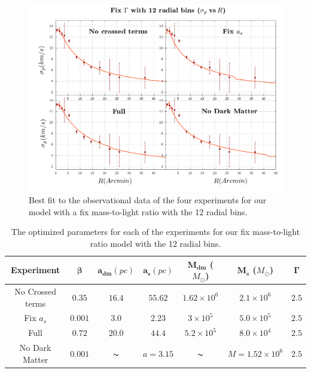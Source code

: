 \begin{figure}[H]
\centering
\includegraphics[width=15cm]{images/fix_gamma_refinado_12.png}
\caption[Best fit of our model with a fix mass-to-light ratio for the 12 radial bins]{Best fit to the observational data of the four experiments for our model with a fix mass-to-light ratio with the 12 radial bins.}
\end{figure}

\begin{table}[H]
\begin{center}
\begin{tabular}{| c| c| c| c| c| c| c|}
    \hline
    \textbf{Experiment} & $\mathbf{\beta}$ & $\mathbf{a_{dm}} (pc)$ & $\mathbf{a_{s}} (pc)$ & $\mathbf{M_{dm}}$ ($M_{\odot}$) & $\mathbf{M_{s}}$ ($M_{\odot}$) & $\mathbf{\Gamma}$\\ \hline
	No Crossed terms & $0.35$ &	$16.4$ &	$55.62$ &	$1.62 \times 10^{6}$ &	$2.1 \times 10^{6}$ &	$2.5$\\ \hline
	Fix $a_s$ &	$0.001$ &	$3.0$ &	$2.23$ &	$3 \times 10^{5}$ &	$5.0 \times 10 ^{5}$ &	$2.5$\\ \hline
	Full &	$0.72$ &	$20.0$ &	$44.4$ &	$5.2 \times 10^{5}$ &	$8.0 \times 10^{4}$ &	$2.5$\\ \hline
	No Dark Matter &	$0.001$ &	$\thicksim$ & $ a = 3.15$ &	$\thicksim$ & $  M = 1.52 \times 10^{6}$ & 	$2.5$\\
    \hline
  \end{tabular} 
\caption[Optimized parameters for our fix mass-to-light ratio model with the 12 radial bins.]{The optimized parameters for each of the experiments for our fix mass-to-light ratio model with the 12 radial bins.}
\end{center}
\end{table}

